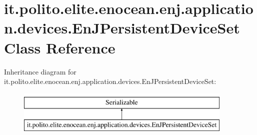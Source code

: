 \hypertarget{classit_1_1polito_1_1elite_1_1enocean_1_1enj_1_1application_1_1devices_1_1_en_j_persistent_device_set}{}\section{it.\+polito.\+elite.\+enocean.\+enj.\+application.\+devices.\+En\+J\+Persistent\+Device\+Set Class Reference}
\label{classit_1_1polito_1_1elite_1_1enocean_1_1enj_1_1application_1_1devices_1_1_en_j_persistent_device_set}
Inheritance diagram for it.\+polito.\+elite.\+enocean.\+enj.\+application.\+devices.\+En\+J\+Persistent\+Device\+Set\+:\begin{figure}[H]
\begin{center}
\leavevmode
\includegraphics[height=2.000000cm]{classit_1_1polito_1_1elite_1_1enocean_1_1enj_1_1application_1_1devices_1_1_en_j_persistent_device_set}
\end{center}
\end{figure}
